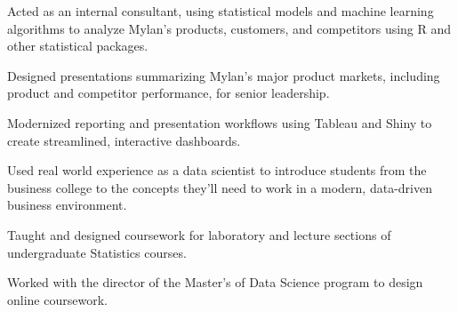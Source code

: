 \documentclass[letterpaper]{deedy-resume} %
\begin{document}
\begin{minipage}[t]{0.63\textwidth}

\begin{tightitemize}
\item Acted as an internal consultant, using statistical models and machine
  learning algorithms to 
  analyze Mylan's products, customers, and competitors using R and
  other statistical packages.
\item Designed presentations summarizing Mylan's major product markets,
  including product and competitor performance, for senior leadership.
\item Modernized reporting and presentation workflows using Tableau and
  Shiny to create streamlined, interactive dashboards.
\end{tightitemize}
\sectionspace %


\begin{tightitemize}
\item Used real world experience as a data scientist to introduce
  students from the business college to the concepts they'll need to
  work in a modern, data-driven  business environment.
\end{tightitemize}
\sectionspace %



\begin{tightitemize}
\item Taught and designed coursework for laboratory and
  lecture sections of undergraduate Statistics courses.
\item Worked with the director of the Master's of Data Science program
  to design online coursework.
\end{tightitemize}

\sectionspace %



\end{minipage}
\end{document}
